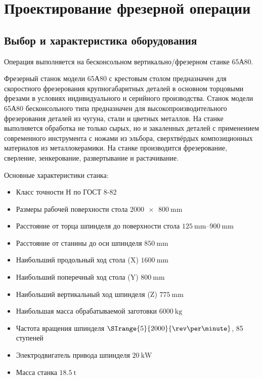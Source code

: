 \documentclass[14pt,russian,a4paper]{extreport}
\begin{document}
\section{Проектирование фрезерной операции}

\subsection{Выбор и характеристика оборудования}

Операция выполняется на бесконсольном вертикально\-/фрезерном станке 65А80.

Фрезерный станок модели 65А80 с крестовым столом предназначен для скоростного фрезерования крупногабаритных деталей в основном торцовыми фрезами в условиях индивидуального и серийного производства. Станок модели 65А80 бесконсольного типа предназначен для высокопроизводительного фрезерования деталей из чугуна, стали и цветных металлов. На станке выполняется обработка не только сырых, но и закаленных деталей с применением современного инструмента с ножами из эльбора, сверхтвёрдых композиционных материалов из металлокерамики. На станке производится фрезерование, сверление, зенкерование, развертывание и растачивание.

Основные характеристики станка:
\begin{itemize}
	\item Класс точности Н по ГОСТ 8-82
	\item Размеры рабочей поверхности стола $\SI{2000 x 800}{\milli\meter}$
	\item Расстояние от торца шпинделя до поверхности стола $\SIrange{125}{900}{\milli\meter}$
	\item Расстояние от станины до оси шпинделя $\SI{850}{\milli\meter}$
	\item Наибольший продольный ход стола (X) $\SI{1600}{\milli\meter}$
	\item Наибольший поперечный ход стола (Y) $\SI{800}{\milli\meter}$
	\item Наибольший вертикальный ход шпинделя (Z) $\SI{775}{\milli\meter}$
	\item Наибольшая масса обрабатываемой заготовки $\SI{6000}{\kilo\gram}$
	\item Частота вращения шпинделя $\SIrange{5}{2000}{\rev\per\minute}$, 85 ступеней
	\item Электродвигатель привода шпинделя $\SI{20}{\kilo\watt}$
	\item Масса станка $\SI{18,5}{\tonne}$
\end{itemize}
 
\end{document}
